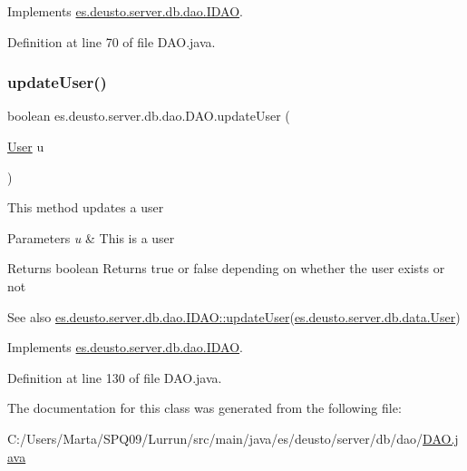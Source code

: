Implements \hyperlink{interfacees_1_1deusto_1_1server_1_1db_1_1dao_1_1_i_d_a_o_a601329b95123948b10c3232687b11d5b}{es.\+deusto.\+server.\+db.\+dao.\+I\+D\+AO}.



Definition at line 70 of file D\+A\+O.\+java.

\mbox{\label{classes_1_1deusto_1_1server_1_1db_1_1dao_1_1_d_a_o_a7f6ed77294fe1f61cbebbea410cef6e0}} 
\subsubsection{\texorpdfstring{update\+User()}{updateUser()}}
{\footnotesize\ttfamily boolean es.\+deusto.\+server.\+db.\+dao.\+D\+A\+O.\+update\+User (\begin{DoxyParamCaption}\item[{\hyperlink{classes_1_1deusto_1_1server_1_1db_1_1data_1_1_user}{User}}]{u }\end{DoxyParamCaption})}

This method updates a user 
\begin{DoxyParams}{Parameters}
{\em u} & This is a user \\
\hline
\end{DoxyParams}
\begin{DoxyReturn}{Returns}
boolean Returns true or false depending on whether the user exists or not 
\end{DoxyReturn}
\begin{DoxySeeAlso}{See also}
\hyperlink{interfacees_1_1deusto_1_1server_1_1db_1_1dao_1_1_i_d_a_o_a790b00e2989b634c1bbb2c6620ff3583}{es.\+deusto.\+server.\+db.\+dao.\+I\+D\+A\+O\+::update\+User}(\hyperlink{classes_1_1deusto_1_1server_1_1db_1_1data_1_1_user}{es.\+deusto.\+server.\+db.\+data.\+User}) 
\end{DoxySeeAlso}


Implements \hyperlink{interfacees_1_1deusto_1_1server_1_1db_1_1dao_1_1_i_d_a_o_a790b00e2989b634c1bbb2c6620ff3583}{es.\+deusto.\+server.\+db.\+dao.\+I\+D\+AO}.



Definition at line 130 of file D\+A\+O.\+java.



The documentation for this class was generated from the following file\+:\begin{DoxyCompactItemize}
\item 
C\+:/\+Users/\+Marta/\+S\+P\+Q09/\+Lurrun/src/main/java/es/deusto/server/db/dao/\hyperlink{_d_a_o_8java}{D\+A\+O.\+java}\end{DoxyCompactItemize}
